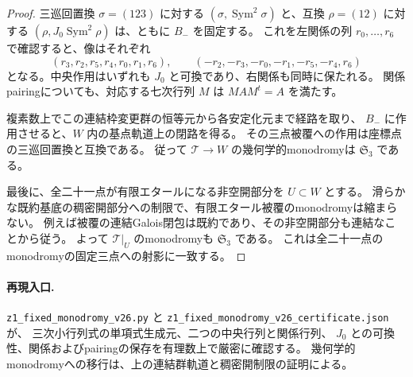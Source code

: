 \begin{proof}
三巡回置換 $\sigma=(123)$ に対する
$(\sigma,\operatorname{Sym}^2\sigma)$ と、互換 $\rho=(12)$ に対する
$(\rho,J_0\operatorname{Sym}^2\rho)$ は、ともに $B_-$ を固定する。
これを左関係の列 $r_0,\ldots,r_6$ で確認すると、像はそれぞれ
\[
 (r_3,r_2,r_5,r_4,r_0,r_1,r_6),\qquad
 (-r_2,-r_3,-r_0,-r_1,-r_5,-r_4,r_6)
\]
となる。中央作用はいずれも $J_0$ と可換であり、右関係も同時に保たれる。
関係pairingについても、対応する七次行列 $M$ は $MAM^t=A$ を満たす。

複素数上でこの連結枠変更群の恒等元から各安定化元まで経路を取り、
$B_-$ に作用させると、$W$ 内の基点軌道上の閉路を得る。
その三点被覆への作用は座標点の三巡回置換と互換である。
従って $\mathcal T\to W$ の幾何学的monodromyは $\mathfrak S_3$ である。

最後に、全二十一点が有限エタールになる非空開部分を $U\subset W$ とする。
滑らかな既約基底の稠密開部分への制限で、有限エタール被覆のmonodromyは縮まらない。
例えば被覆の連結Galois閉包は既約であり、その非空開部分も連結なことから従う。
よって $\mathcal T|_U$ のmonodromyも $\mathfrak S_3$ である。
これは全二十一点のmonodromyの固定三点への射影に一致する。
\end{proof}

\paragraph{再現入口.}
\nolinkurl{z1_fixed_monodromy_v26.py} と
\nolinkurl{z1_fixed_monodromy_v26_certificate.json} が、
三次小行列式の単項式生成元、二つの中央行列と関係行列、
$J_0$ との可換性、関係およびpairingの保存を有理数上で厳密に確認する。
幾何学的monodromyへの移行は、上の連結群軌道と稠密開制限の証明による。
